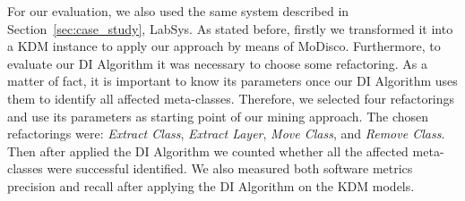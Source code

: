 For our evaluation, we also used the same system described in Section~\ref{sec:case_study}, LabSys. As stated before, firstly we transformed it into a KDM instance to apply our approach by means of MoDisco. %
%
%
%
%
Furthermore, to evaluate our DI Algorithm it was necessary to choose some refactoring. As a matter of fact, it is important to know its parameters once our DI Algorithm uses them to identify all affected meta-classes. Therefore, we selected four refactorings and use its parameters as starting point of our mining approach. The chosen refactorings were: \textit{Extract Class}, \textit{Extract Layer}, \textit{Move Class}, and \textit{Remove Class}. %
%
%
%
Then after applied the DI Algorithm we counted whether all the affected meta-classes were successful identified.%
We also measured both software metrics precision and recall after applying the DI Algorithm on the KDM models.


